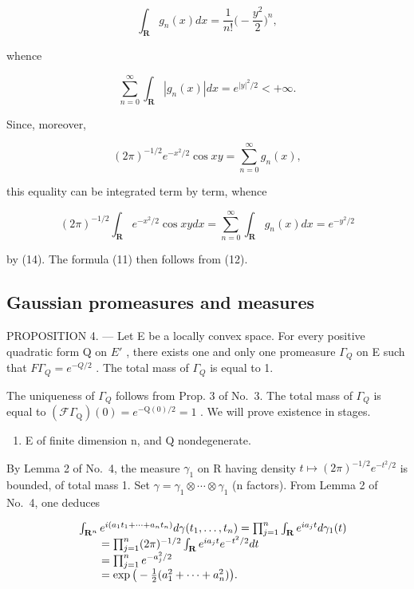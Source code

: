 \[
\int_ {\mathbf {R}} g _ {n} (x) d x = \frac {1}{n !} \Big (- \frac {y ^ {2}}{2} \Big) ^ {n},
\]

whence

\[
\sum_ {n = 0} ^ {\infty} \int_ {\mathbf {R}} | g _ {n} (x) | d x = e ^ {| y | ^ {2} / 2} <   + \infty .
\]

Since, moreover,

\[
(2 \pi) ^ {- 1 / 2} e ^ {- x ^ {2} / 2} \cos x y = \sum_ {n = 0} ^ {\infty} g _ {n} (x),
\]

this equality can be integrated term by term, whence

\[
(2 \pi) ^ {- 1 / 2} \int_ {\mathbf {R}} e ^ {- x ^ {2} / 2} \cos x y d x = \sum_ {n = 0} ^ {\infty} \int_ {\mathbf {R}} g _ {n} (x) d x = e ^ {- y ^ {2} / 2}
\]

by (14). The formula (11) then follows from (12).

\subsection{Gaussian promeasures and measures}

PROPOSITION 4. --- Let E be a locally convex space. For every positive quadratic form Q on \(E'\) , there exists one and only one promeasure \(\Gamma_{Q}\) on E such that \(F\Gamma_{Q}=e^{-Q/2}\) . The total mass of \(\Gamma_{Q}\) is equal to 1.

The uniqueness of \(\Gamma_{Q}\) follows from Prop. 3 of No.~3. The total mass of \(\Gamma_{Q}\) is equal to \((\mathcal{F}\Gamma_{\mathrm{Q}})(0)=e^{-\mathrm{Q}(0)/2}=1\) . We will prove existence in stages.

\begin{enumerate}
\def\labelenumi{\Alph{enumi})}
\tightlist
\item
  E of finite dimension n, and Q nondegenerate.
\end{enumerate}

By Lemma 2 of No.~4, the measure \(\gamma_{1}\) on R having density \(t \mapsto (2\pi)^{-1/2}e^{-t^{2}/2}\) is bounded, of total mass 1. Set \(\gamma = \gamma_{1} \otimes \cdots \otimes \gamma_{1}\) (n factors). From Lemma 2 of No.~4, one deduces

\[
\begin{array}{r l} & {\int_ {\mathbf {R} ^ {n}} e ^ {i (a _ {1} t _ {1} + \dots + a _ {n} t _ {n})} d \gamma (t _ {1}, \ldots , t _ {n}) = \prod_ {j = 1} ^ {n} \int_ {\mathbf {R}} e ^ {i a _ {j} t} d \gamma_ {1} (t)} \\ & {\qquad = \prod_ {j = 1} ^ {n} (2 \pi) ^ {- 1 / 2} \int_ {\mathbf {R}} e ^ {i a _ {j} t} e ^ {- t ^ {2} / 2} d t} \\ & {\qquad = \prod_ {j = 1} ^ {n} e ^ {- a _ {j} ^ {2} / 2}} \\ & {\qquad = \exp \big (- \frac {1}{2} (a _ {1} ^ {2} + \dots + a _ {n} ^ {2}) \big).} \end{array}
\]


